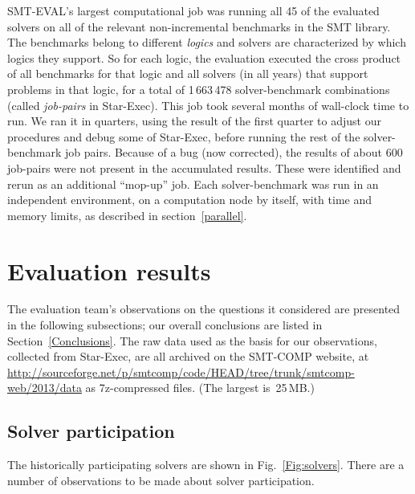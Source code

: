 \documentclass[smallcondensed]{svjour3}
\begin{document}
SMT-EVAL's largest computational job was running all 45 of the evaluated solvers on all of the relevant non-incremental benchmarks in the SMT library. 
The benchmarks belong to different {\em logics} and solvers are characterized by which logics they support. 
So for each logic, the evaluation executed the cross product of all benchmarks for that logic and all solvers (in all years) that support problems in that logic, for a total of 1\,663\,478 solver-benchmark combinations (called {\em job-pairs} in Star-Exec). 
This job took several months of wall-clock time to run. 
We ran it in quarters, using the result of the first quarter to adjust our procedures and debug some of Star-Exec, before running the rest of the solver-benchmark job pairs. 
Because of a bug (now corrected), the results of about 600 job-pairs were not present in the accumulated results. 
These were identified and rerun as an additional ``mop-up'' job. 
Each solver-benchmark was run in an independent environment, on a computation node by itself, with time and memory limits, as described in section~\ref{parallel}.

\section{Evaluation results}
\label{Evaluations}

The evaluation team's observations on the questions it considered are presented in the following subsections; our overall conclusions are listed in Section~\ref{Conclusions}.  The raw data used as the basis for our observations, collected from Star-Exec, are all archived on the SMT-COMP website, at \url{http://sourceforge.net/p/smtcomp/code/HEAD/tree/trunk/smtcomp-web/2013/data} as 7z-compressed files.  (The largest is~25\,MB.)

\subsection{Solver participation}
\label{Solvers}

The historically participating solvers are shown in Fig.~\ref{Fig:solvers}. There are a number of observations to be made about solver participation.
   
\end{document}
